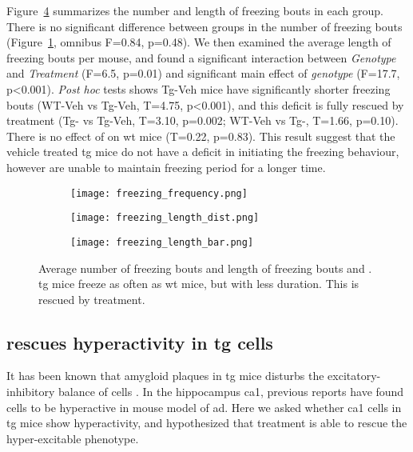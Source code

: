 Figure~\ref{f.ad.freezing_profile} summarizes the number and length of freezing bouts in each group. There is no significant difference between groups in the number of freezing bouts (Figure~\ref{f.ad.freezing_freq}, omnibus F=0.84, p=0.48). We then examined the average length of freezing bouts per mouse, and found a significant interaction between \textit{Genotype} and \textit{Treatment} (F=6.5, p=0.01) and significant main effect of \textit{genotype} (F=17.7, p<0.001). \textit{Post hoc} tests shows Tg-Veh mice have significantly shorter freezing bouts (WT-Veh vs Tg-Veh, T=4.75, p<0.001), and this deficit is fully rescued by \tglu{} treatment (Tg-\glu{} vs Tg-Veh, T=3.10, p=0.002; WT-Veh vs Tg-\glu, T=1.66, p=0.10). There is no effect of \tglu{} on \gls{wt} mice (T=0.22, p=0.83). This result suggest that the vehicle treated \gls{tg} mice do not have a deficit in initiating the freezing behaviour, however are unable to maintain freezing period for a longer time. 

\begin{figure}[h]
    \begin{subfigure}[h]{\textwidth}
        \texttt{[image: freezing\_frequency.png]}
        \caption{\label{f.ad.freezing_freq}}
    \end{subfigure}
    \begin{subfigure}[h]{0.4\textwidth}
        \texttt{[image: freezing\_length\_dist.png]}
        \caption{\label{f.ad.freezing_length_dist}}
    \end{subfigure}
    \begin{subfigure}[h]{0.6\textwidth}
        \texttt{[image: freezing\_length\_bar.png]}
        \caption{\label{f.ad.freezing_length_bar}}
    \end{subfigure}
    \caption[Freezing lengths and number of freezing bouts.]{Average number of freezing bouts  and length of freezing bouts  and . \Gls{tg} mice freeze as often as \gls{wt} mice, but with less duration. This is rescued by \tglu{} treatment. \label{f.ad.freezing_profile}}
\end{figure}


\subsection{\tglu{} rescues hyperactivity in \gls{tg} cells}

It has been known that amygloid plaques in \gls{tg} mice disturbs the excitatory-inhibitory balance of cells \citep{palop16}. In the hippocampus \gls{ca1}, previous reports have found cells to be hyperactive in mouse model of \gls{ad}. Here we asked whether \gls{ca1} cells in \gls{tg} mice show hyperactivity, and hypothesized that \tglu{} treatment is able to rescue the hyper-excitable phenotype.

